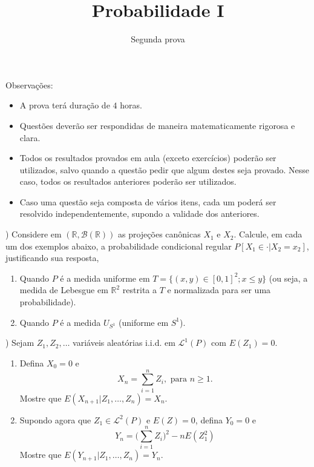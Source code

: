\documentclass{article}
\newcommand*\1{\mathds{1}}
\begin{document}
\title{Probabilidade I}
\author{Segunda prova}

\maketitle

\noindent Observa\c{c}\~oes:
\begin{itemize}
\item A prova ter\'a dura\c{c}\~ao de $ 4 $ horas.
\item Quest\~oes dever\~ao ser respondidas de maneira ma\-te\-ma\-ti\-ca\-men\-te rigorosa e clara.
\item Todos os resultados provados em aula (exceto exerc\'icios) poder\~ao ser utilizados, salvo quando a quest\~ao pedir que algum destes seja provado. Nesse caso, todos os resultados anteriores poder\~ao ser utilizados.
\item Caso uma quest\~ao seja composta de v\'arios itens, cada um poder\'a ser resolvido independentemente, supondo a validade dos anteriores.
\end{itemize}

\vspace{4mm}
) Considere em $(\mathbb{R}, \mathcal{B}(\mathbb{R}))$ as projeções canônicas $X_1$ e $X_2$.
Calcule, em cada um dos exemplos abaixo, a probabilidade condicional regular $P[X_1 \in \cdot|X_2 = x_2]$, justificando sua resposta,
\begin{enumerate}
\item Quando $P$ é a medida uniforme em $T = \{(x,y) \in [0,1]^2; x \leq y\}$ (ou seja, a medida de Lebesgue em $\mathbb{R}^2$ restrita a $T$ e normalizada para ser uma probabilidade).
\item Quando $P$ é a medida $U_{S^1}$ (uniforme em $S^1$).

  
\end{enumerate}



\vspace{4mm}

\medskip


) Sejam $Z_1, Z_2, \dots$ variáveis aleatórias i.i.d. em $\mathcal{L}^1(P)$ com $E(Z_1) = 0$.
\begin{enumerate}[\quad a)]
\item Defina $X_0 = 0$ e
  \begin{equation}
    X_n = \sum_{i = 1}^n Z_i, \text{ para $n \geq 1$.}
  \end{equation}
  Mostre que $E(X_{n + 1} | Z_1, \dots, Z_n) = X_n$.
\item Supondo agora que $Z_1 \in \mathcal{L}^2(P)$ e $E(Z) = 0$, defina $Y_0 = 0$ e
  \begin{equation}
    Y_n = \Big( \sum_{i = 1}^n Z_i \Big)^2 - n E(Z_1^2)
  \end{equation}
  Mostre que $E(Y_{n + 1} | Z_1, \dots, Z_n) = Y_n$.
\end{enumerate}
\end{document}
